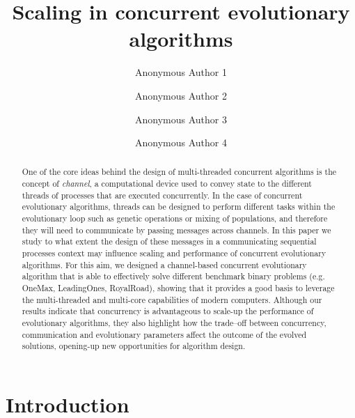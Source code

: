 \documentclass[runningheads]{llncs}\usepackage[]{graphicx}\usepackage[]{color}
\begin{document}
\title{Scaling in concurrent evolutionary algorithms}


\author{Anonymous Author 1 \and
Anonymous Author 2 \and
Anonymous Author 3 \and
Anonymous Author 4 }
%


\maketitle

\begin{abstract}
One of the core ideas behind the design of multi-threaded concurrent
algorithms is the concept of \emph{channel}, a computational device
used to convey state to the different threads of processes that are
executed concurrently. In the case of concurrent evolutionary
algorithms, threads can be designed to perform different tasks within
the evolutionary loop such as genetic operations or mixing of
populations, and therefore they will need to communicate by passing
messages across channels. In this paper we study to what extent the
design of these messages in a communicating sequential processes
context may influence scaling and performance of concurrent
evolutionary algorithms. For this aim, we designed a channel-based
concurrent evolutionary algorithm that is able to effectively solve
different benchmark binary problems (e.g. OneMax, LeadingOnes,
RoyalRoad), showing that it provides a good basis to leverage the
multi-threaded and multi-core capabilities of modern
computers. Although our results indicate that concurrency is
advantageous to scale-up the performance of evolutionary algorithms,
they also highlight how the trade--off between concurrency,
communication and evolutionary parameters affect the outcome of the
evolved solutions, opening-up new opportunities for algorithm design. 
\end{abstract}


\section{Introduction}
\end{document}
